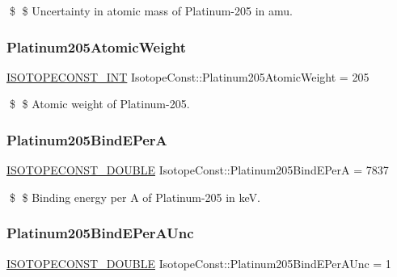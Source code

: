 \$ \$ Uncertainty in atomic mass of Platinum-\/205 in amu. \mbox{\label{group___isotope_const-_platinum-_pt205_ga42a1e64b3eeabc93ee8e039b91cadd7e}} 
\subsubsection{\texorpdfstring{Platinum205\+Atomic\+Weight}{Platinum205AtomicWeight}}
{\footnotesize\ttfamily \mbox{\hyperlink{group___isotope_const-_macros_ga5f18360b3e99483a35c32d789e62621c}{I\+S\+O\+T\+O\+P\+E\+C\+O\+N\+S\+T\+\_\+\+I\+NT}} Isotope\+Const\+::\+Platinum205\+Atomic\+Weight = 205}

\$ \$ Atomic weight of Platinum-\/205. \mbox{\label{group___isotope_const-_platinum-_pt205_gab7da7d7ee4fc9c79e65346c69ca3223f}} 
\subsubsection{\texorpdfstring{Platinum205\+Bind\+E\+PerA}{Platinum205BindEPerA}}
{\footnotesize\ttfamily \mbox{\hyperlink{group___isotope_const-_macros_ga8f45a7272ce02c0b4c65c44636ed719a}{I\+S\+O\+T\+O\+P\+E\+C\+O\+N\+S\+T\+\_\+\+D\+O\+U\+B\+LE}} Isotope\+Const\+::\+Platinum205\+Bind\+E\+PerA = 7837}

\$ \$ Binding energy per A of Platinum-\/205 in keV. \mbox{\label{group___isotope_const-_platinum-_pt205_ga64631239a4fc1356f31c17b286ffab4b}} 
\subsubsection{\texorpdfstring{Platinum205\+Bind\+E\+Per\+A\+Unc}{Platinum205BindEPerAUnc}}
{\footnotesize\ttfamily \mbox{\hyperlink{group___isotope_const-_macros_ga8f45a7272ce02c0b4c65c44636ed719a}{I\+S\+O\+T\+O\+P\+E\+C\+O\+N\+S\+T\+\_\+\+D\+O\+U\+B\+LE}} Isotope\+Const\+::\+Platinum205\+Bind\+E\+Per\+A\+Unc = 1}

